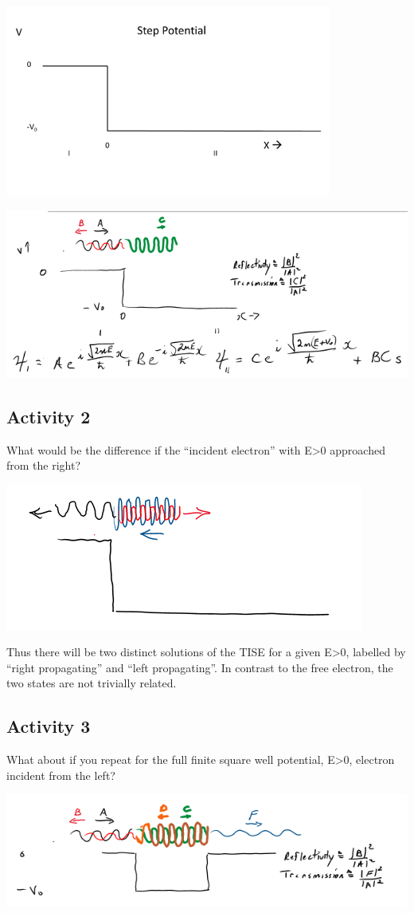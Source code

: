 \documentclass{article}
\begin{document}
\includegraphics[width = 0.6 \textwidth]{Lecture10/1.png}

\includegraphics[width = 0.8 \textwidth]{Lecture10/2.png}

\subsection{Activity 2}

What would be the difference if the “incident electron” with E>0 approached from the right?

\includegraphics[width = 0.4 \textwidth]{Lecture10/3.png}

Thus there will be two distinct solutions of the TISE for a given E>0, labelled by “right propagating” and “left propagating”.  In contrast to the free electron, the two states are not trivially related.

\subsection{Activity 3}

What about if you repeat for the full finite square well potential, E>0, electron incident from the left?

\includegraphics[width = 0.8 \textwidth]{Lecture10/4.png}
\end{document}
